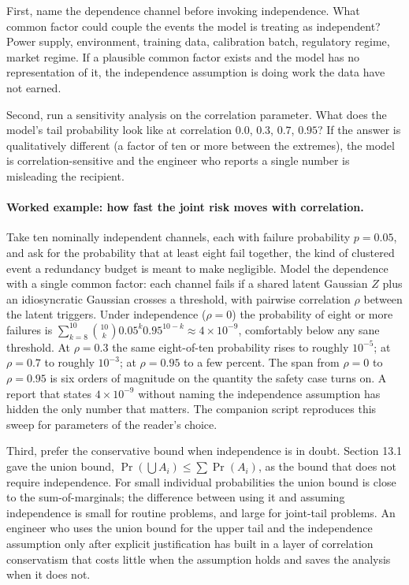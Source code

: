 First, name the dependence channel before invoking independence.
What common factor could couple the events the model is treating as
independent? Power supply, environment, training data, calibration
batch, regulatory regime, market regime. If a plausible common
factor exists and the model has no representation of it, the
independence assumption is doing work the data have not earned.

Second, run a sensitivity analysis on the correlation parameter.
What does the model's tail probability look like at correlation
$0.0$, $0.3$, $0.7$, $0.95$? If the answer is qualitatively
different (a factor of ten or more between the extremes), the
model is correlation-sensitive and the engineer who reports a
single number is misleading the recipient.

\paragraph{Worked example: how fast the joint risk moves with
correlation.} Take ten nominally independent channels, each with
failure probability $p = 0.05$, and ask for the probability that at
least eight fail together, the kind of clustered event a redundancy
budget is meant to make negligible. Model the dependence with a
single common factor: each channel fails if a shared latent
Gaussian $Z$ plus an idiosyncratic Gaussian crosses a threshold,
with pairwise correlation $\rho$ between the latent triggers. Under
independence ($\rho = 0$) the probability of eight or more failures
is $\sum_{k=8}^{10} \binom{10}{k} 0.05^{k} 0.95^{10-k} \approx
4 \times 10^{-9}$, comfortably below any sane threshold. At
$\rho = 0.3$ the same eight-of-ten probability rises to roughly
$10^{-5}$; at $\rho = 0.7$ to roughly $10^{-3}$; at $\rho = 0.95$
to a few percent. The span from $\rho = 0$ to $\rho = 0.95$ is six
orders of magnitude on the quantity the safety case turns on. A
report that states $4 \times 10^{-9}$ without naming the
independence assumption has hidden the only number that matters.
The companion script
reproduces this sweep for parameters of the reader's choice.

Third, prefer the conservative bound when independence is in doubt.
Section 13.1 gave the union bound, $\Pr(\bigcup A_{i}) \leq \sum
\Pr(A_{i})$, as the bound that does not require independence. For
small individual probabilities the union bound is close to the
sum-of-marginals; the difference between using it and assuming
independence is small for routine problems, and large for
joint-tail problems. An engineer who uses the union bound for the
upper tail and the independence assumption only after explicit
justification has built in a layer of correlation conservatism that
costs little when the assumption holds and saves the analysis when
it does not.


